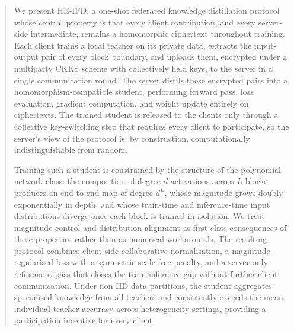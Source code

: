 \documentclass[lettersize,journal]{IEEEtran}
\begin{document}
\begin{abstract}


We present HE-IFD, a one-shot federated knowledge distillation protocol whose central property is that every client contribution, and every server-side intermediate, remains a homomorphic ciphertext throughout training. Each client trains a local teacher on its private data, extracts the input-output pair of every block boundary, and uploads them, encrypted under a multiparty CKKS scheme with collectively held keys, to the server in a single communication round. The server distils these encrypted pairs into a homomorphism-compatible student, performing forward pass, loss evaluation, gradient computation, and weight update entirely on ciphertexts. The trained student is released to the clients only through a collective key-switching step that requires every client to participate, so the server's view of the protocol is, by construction, computationally indistinguishable from random.

Training such a student is constrained by the structure of the polynomial network class: the composition of degree-$d$ activations across $L$ blocks produces an end-to-end map of degree $d^L$, whose magnitude grows doubly-exponentially in depth, and whose train-time and inference-time input distributions diverge once each block is trained in isolation. We treat magnitude control and distribution alignment as first-class consequences of these properties rather than as numerical workarounds. The resulting protocol combines client-side collaborative normalisation, a magnitude-regularised loss with a symmetric scale-free penalty, and a server-only refinement pass that closes the train-inference gap without further client communication. Under non-IID data partitions, the student aggregates specialised knowledge from all teachers and consistently exceeds the mean individual teacher accuracy across heterogeneity settings, providing a participation incentive for every client.


\end{abstract}
\end{document}

